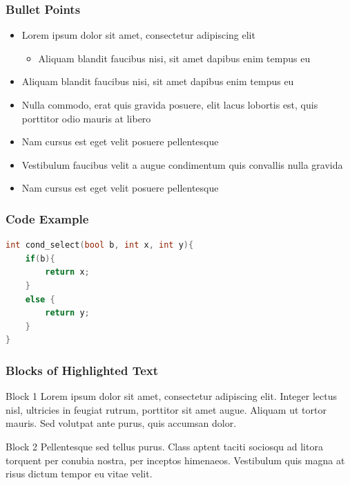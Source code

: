 \documentclass{beamer}
\begin{document}

\begin{frame}
\frametitle{Bullet Points}
\begin{itemize}[<+->]
\item Lorem ipsum dolor sit amet, consectetur adipiscing elit
\begin{itemize}
\item Aliquam blandit faucibus nisi, sit amet dapibus enim tempus eu
\end{itemize}
\item Aliquam blandit faucibus nisi, sit amet dapibus enim tempus eu
\item Nulla commodo, erat quis gravida posuere, elit lacus lobortis est, quis porttitor odio mauris at libero
\item Nam cursus est eget velit posuere pellentesque
\item Vestibulum faucibus velit a augue condimentum quis convallis nulla gravida
\item Nam cursus est eget velit posuere pellentesque
\end{itemize}
\end{frame}


\begin{frame}[fragile]
\frametitle{Code Example}

	
	{
		
		\begin{lstlisting}[language=c,caption=C Code,basicstyle=\ttfamily,linebackgroundcolor={\ifnum\value{lstnumber}=2\color{uni-green}\else\color{white}\fi}]		
int cond_select(bool b, int x, int y){
	if(b){
		return x;
	} 
	else {
		return y;
	}
}
		\end{lstlisting}
		
	}
	

\end{frame}

\begin{frame}
\frametitle{Blocks of Highlighted Text}
\begin{block}{Block 1}
Lorem ipsum dolor sit amet, consectetur adipiscing elit. Integer lectus nisl, ultricies in feugiat rutrum, porttitor sit amet augue. Aliquam ut tortor mauris. Sed volutpat ante purus, quis accumsan dolor.
\end{block}

\begin{block}{Block 2}
Pellentesque sed tellus purus. Class aptent taciti sociosqu ad litora torquent per conubia nostra, per inceptos himenaeos. Vestibulum quis magna at risus dictum tempor eu vitae velit.
\end{block}

\end{frame}
\end{document}
